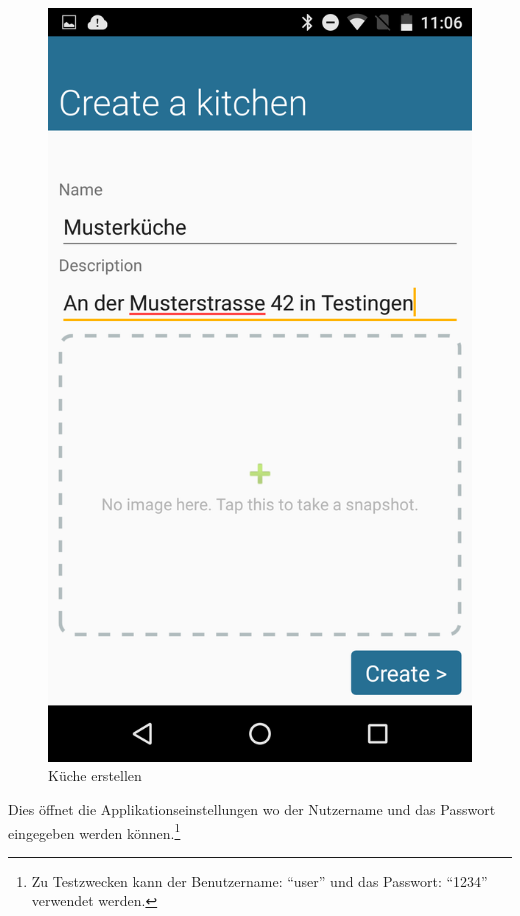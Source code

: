 \begin{figure}
	\vspace{-0.44cm}
	\includegraphics[scale=0.13]{results/res/create_kitchen}
	\caption{Küche erstellen}
\end{figure}
Dies öffnet die Applikationseinstellungen wo der Nutzername und das Passwort eingegeben werden können.\footnote{Zu Testzwecken kann der Benutzername: \enquote{user} und das Passwort: \enquote{1234} verwendet werden.}

